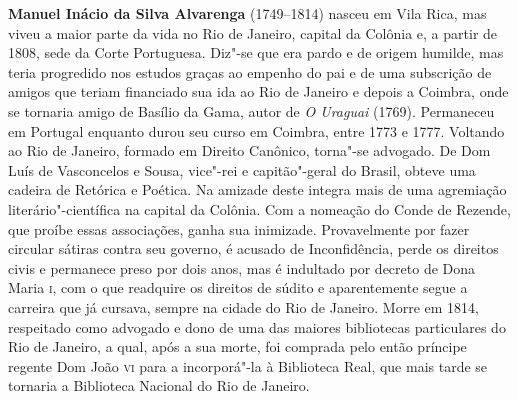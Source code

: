 \textbf{Manuel Inácio da Silva Alvarenga} (1749--1814) nasceu em Vila Rica,
mas viveu a maior parte da vida no Rio de Janeiro, capital da Colônia
e, a partir de 1808, sede da Corte Portuguesa.
Diz"-se que era pardo e de origem humilde, mas teria progredido
nos estudos graças ao empenho do pai e de uma subscrição de amigos
que teriam financiado sua ida ao Rio de Janeiro e depois a Coimbra,
onde se tornaria amigo de Basílio da Gama, autor de \textit{O Uraguai} (1769).
Permaneceu em Portugal enquanto durou seu curso em Coimbra,
entre 1773 e 1777. Voltando ao Rio de Janeiro, formado em Direito
Canônico, torna"-se advogado. 
De Dom Luís de Vasconcelos e Sousa, vice"-rei e capitão"-geral do Brasil,
obteve uma cadeira de Retórica e Poética. Na amizade deste integra mais
de uma agremiação literário"-científica na capital da Colônia. Com a
nomeação do Conde de Rezende, que proíbe essas associações,
ganha sua inimizade. Provavelmente por fazer circular sátiras contra seu
governo, é acusado de Inconfidência, perde os direitos civis e permanece
preso por dois anos, mas é indultado por decreto de Dona Maria \textsc{i}, com o
que readquire os direitos de súdito e aparentemente segue a carreira
que já cursava, sempre na cidade do Rio de Janeiro. Morre em 1814,
respeitado como advogado e dono de uma das maiores bibliotecas particulares
do Rio de Janeiro, a qual, após a sua morte, foi comprada pelo então príncipe
regente Dom João \textsc{vi} para a incorporá"-la à Biblioteca Real, que mais tarde
se tornaria a Biblioteca Nacional do Rio de Janeiro.

